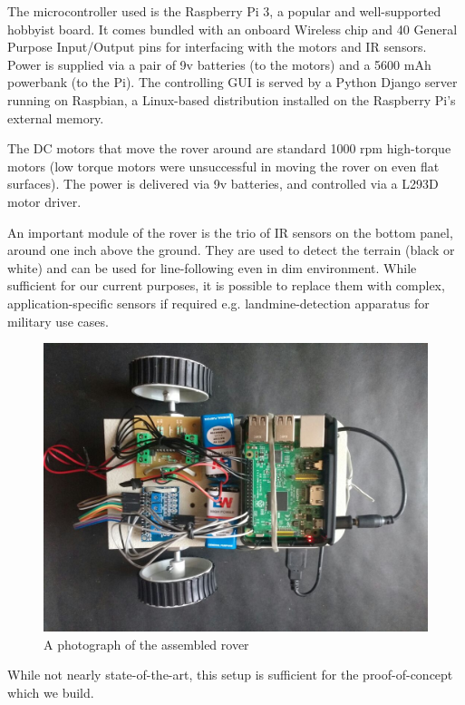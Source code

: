 \begin{description}[font=\quad $\circ$, topsep=-2pt, itemsep=2pt]
	\item The microcontroller used is the Raspberry Pi 3, a popular and well-supported hobbyist board. It comes bundled with an onboard Wireless chip and 40 General Purpose Input/Output pins for interfacing with the motors and IR sensors. Power is supplied via a pair of 9v batteries (to the motors) and a 5600 mAh powerbank (to the Pi). The controlling GUI is served by a Python Django server running on Raspbian, a Linux-based distribution installed on the Raspberry Pi’s external memory.

	\item The DC motors that move the rover around are standard 1000 rpm high-torque motors \cite{1000RPMMotors} (low torque motors were unsuccessful in moving the rover on even flat surfaces). The power is delivered via 9v batteries, and controlled via a L293D motor driver. 


	\item An important module of the rover is the trio of IR sensors on the bottom panel, around one inch above the ground. They are used to detect the terrain (black or white) and can be used for line-following even in dim environment. While sufficient for our current purposes, it is possible to replace them with complex, application-specific sensors if required e.g. landmine-detection apparatus for military use cases. \\

	\begin{figure}[ht]	%
		\centering
		\includegraphics[width=\linewidth]{"./bot-pic-top.jpg"}
		\caption{A photograph of the assembled rover}
		\label{fig:BotPicTop}
	\end{figure}
	
\end{description}

While not nearly state-of-the-art, this setup is sufficient for the proof-of-concept which we build.

